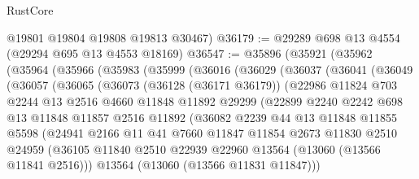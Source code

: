 \begin{lexlean}{RustCore}
\begin{coremodule}
      @19801
      @19804
      @19808
      @19813
      @30467)
@36179 := @29289 @698 @13 @4554 (@29294 @695 @13 @4553 @18169)
@36547 := @35896
    (@35921
      (@35962
        (@35964
          (@35966
            (@35983
              (@35999
                (@36016
                  (@36029
                    (@36037
                      (@36041
                        (@36049
                          (@36057
                            (@36065
                              (@36073
                                (@36128 (@36171 @36179))
                                (@22986
                                  @11824
                                  @703
                                  @2244
                                  @13
                                  @2516
                                  @4660
                                  @11848
                                  @11892
                                  @29299
                                  (@22899
                                    @2240
                                    @2242
                                    @698
                                    @13
                                    @11848
                                    @11857
                                    @2516
                                    @11892
                                    (@36082
                                      @2239
                                      @44
                                      @13
                                      @11848
                                      @11855
                                      @5598
                                      (@24941
                                        @2166
                                        @11
                                        @41
                                        @7660
                                        @11847
                                        @11854
                                        @2673
                                        @11830
                                        @2510
                                        @24959
                                        (@36105
                                          @11840
                                          @2510
                                          @22939
                                          @22960
                                          @13564
                                          (@13060 (@13566 @11841 @2516)))
                                        @13564
                                        (@13060 (@13566 @11831 @11847)))

\end{coremodule}
\end{lexlean}
